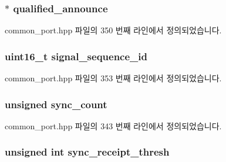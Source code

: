 \subsubsection[{\texorpdfstring{qualified\+\_\+announce}{qualified_announce}}]{$\ast$ qualified\+\_\+announce\hspace{0.3cm}{\ttfamily [private]}}\hypertarget{class_common_port_a32df5c4c87158c487f93549c6b752418}{}\label{class_common_port_a32df5c4c87158c487f93549c6b752418}


common\+\_\+port.\+hpp 파일의 350 번째 라인에서 정의되었습니다.

\subsubsection[{\texorpdfstring{signal\+\_\+sequence\+\_\+id}{signal_sequence_id}}]{\setlength{\rightskip}{0pt plus 5cm}uint16\+\_\+t signal\+\_\+sequence\+\_\+id\hspace{0.3cm}{\ttfamily [private]}}\hypertarget{class_common_port_ad3aef527fd3f4f71fbd140c62d5ac082}{}\label{class_common_port_ad3aef527fd3f4f71fbd140c62d5ac082}


common\+\_\+port.\+hpp 파일의 353 번째 라인에서 정의되었습니다.

\subsubsection[{\texorpdfstring{sync\+\_\+count}{sync_count}}]{\setlength{\rightskip}{0pt plus 5cm}unsigned sync\+\_\+count\hspace{0.3cm}{\ttfamily [private]}}\hypertarget{class_common_port_aa132d04156a99209578443a259a2435c}{}\label{class_common_port_aa132d04156a99209578443a259a2435c}


common\+\_\+port.\+hpp 파일의 343 번째 라인에서 정의되었습니다.

\subsubsection[{\texorpdfstring{sync\+\_\+receipt\+\_\+thresh}{sync_receipt_thresh}}]{\setlength{\rightskip}{0pt plus 5cm}unsigned int sync\+\_\+receipt\+\_\+thresh\hspace{0.3cm}{\ttfamily [private]}}\hypertarget{class_common_port_a232479ab941f1d5473e3bd8cb4831e6c}{}\label{class_common_port_a232479ab941f1d5473e3bd8cb4831e6c}


